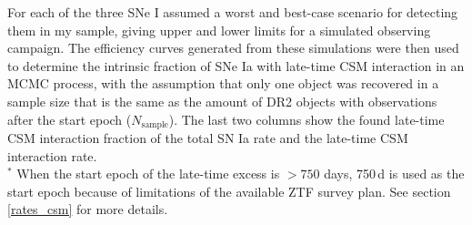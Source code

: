 \documentclass[a4paper,oneside,12pt, class=Latex/Classes/PhDthesisPSnPDF, crop=false]{standalone}
\begin{document}
\begin{table}
 \centering
 \caption[Parameters used for the rate estimation simulations for each object.]{Parameters used for rate estimation simulations for each object.}
\begin{flushleft}
For each of the three SNe I assumed a worst and best-case scenario for detecting them in my sample, giving upper and lower limits for a simulated observing campaign. The efficiency curves generated from these simulations were then used to determine the intrinsic fraction of SNe Ia with late-time CSM interaction in an MCMC process, with the assumption that only one object was recovered in a sample size that is the same as the amount of DR2 objects with observations after the start epoch ($N_\text{sample}$). The last two columns show the found late-time CSM interaction fraction of the total SN Ia rate and the late-time CSM interaction rate.\\
$^{*}$ When the start epoch of the late-time excess is $>750$ days, 750\,d is used as the start epoch because of limitations of the available ZTF survey plan. See section \ref{rates_csm} for more details.\\
\end{flushleft} 
 \label{rate_sims}
\end{table}
\end{document}
